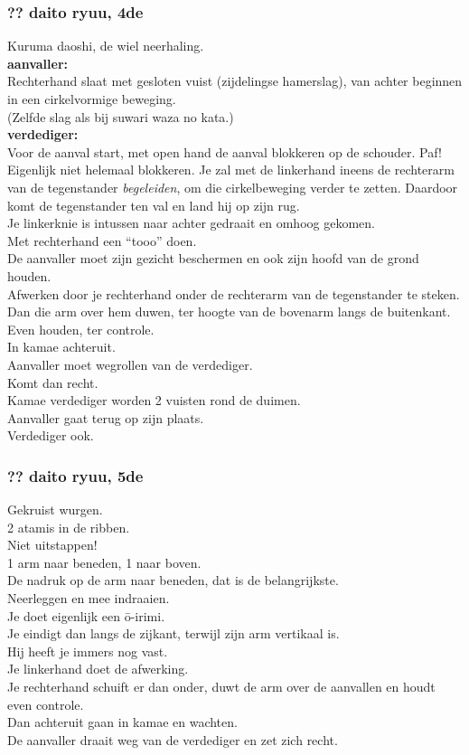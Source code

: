 \subsubsection{?? daito ryuu, 4de}
Kuruma daoshi, de wiel neerhaling.\\
\textbf{aanvaller:}\\
Rechterhand slaat met gesloten vuist (zijdelingse hamerslag), van achter beginnen in een cirkelvormige beweging.\\
(Zelfde slag als bij suwari waza no kata.)\\
\textbf{verdediger:}\\
Voor de aanval start, met open hand de aanval blokkeren op de schouder. Paf!\\
Eigenlijk niet helemaal blokkeren. Je zal met de linkerhand ineens de rechterarm van de tegenstander \textit{begeleiden}, om die cirkelbeweging verder te zetten. Daardoor komt de tegenstander ten val en land hij op zijn rug.\\
Je linkerknie is intussen naar achter gedraait en omhoog gekomen.\\
Met rechterhand een ``tooo'' doen.\\
De aanvaller moet zijn gezicht beschermen en ook zijn hoofd van de grond houden.\\
Afwerken door je rechterhand onder de rechterarm van de tegenstander te steken. Dan die arm over hem duwen, ter hoogte van de bovenarm langs de buitenkant.\\
Even houden, ter controle.\\
In kamae achteruit.\\
Aanvaller moet wegrollen van de verdediger.\\
Komt dan recht.\\
Kamae verdediger worden 2 vuisten rond de duimen.\\
Aanvaller gaat terug op zijn plaats.\\
Verdediger ook.

\subsubsection{?? daito ryuu, 5de}
Gekruist wurgen.\\
2 atamis in de ribben.\\
Niet uitstappen!\\
1 arm naar beneden, 1 naar boven.\\
De nadruk op de arm naar beneden, dat is de belangrijkste.\\
Neerleggen en mee indraaien.\\
Je doet eigenlijk een \={o}-irimi.\\
Je eindigt dan langs de zijkant, terwijl zijn arm vertikaal is.\\
Hij heeft je immers nog vast.\\
Je linkerhand doet de afwerking.\\
Je rechterhand schuift er dan onder, duwt de arm over de aanvallen en houdt even controle.\\
Dan achteruit gaan in kamae en wachten.\\
De aanvaller draait weg van de verdediger en zet zich recht.


